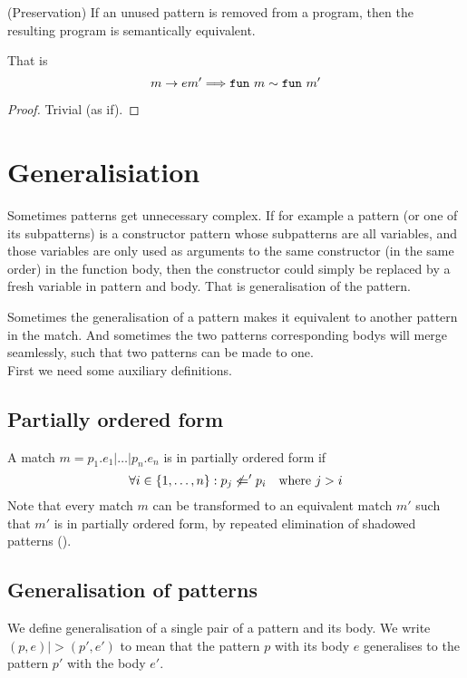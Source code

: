 \begin{lemma}(Preservation)
  If an unused pattern is removed from a program, then the resulting program is
  semantically equivalent.

  That is
  \[
  m ->e m' ==> \texttt{fun}\  m \sim \texttt{fun}\  m'
  \]
\end{lemma}

\begin{proof}
  Trivial (as if).
\end{proof}

\section{Generalisiation}
Sometimes patterns get unnecessary complex. If for example a pattern (or one of
its subpatterns) is a constructor pattern whose subpatterns are all variables,
and those variables are only used as arguments to the same constructor (in the
same order) in the function body, then the constructor could simply be replaced
by a fresh variable in pattern and body. That is generalisation of the pattern.

Sometimes the generalisation of a pattern makes it equivalent to another pattern
in the match. And sometimes the two patterns corresponding bodys will merge
seamlessly, such that two patterns can be made to one.
\\[1em]
First we need some auxiliary definitions.

\subsection{Partially ordered form}
\begin{definition}\label{def:part-order-form}
  A match $m = p_1\texttt{.}e_1\texttt{|}\ldots\texttt{|}p_n\texttt{.}e_n$ is in
  partially ordered form if
  \[
  \forall i \in \{1, \ldots, n\} : p_j \not <=' p_i \quad \textnormal{where $j > i$}
  \]
  Note that every match $m$ can be transformed to an equivalent match $m'$ such
  that $m'$ is in partially ordered form, by repeated elimination of shadowed
  patterns ().
\end{definition}

\subsection{Generalisation of patterns}
We define generalisation of a single pair of a pattern and its body. We write
$(p, e) |> (p', e')$ to mean that the pattern $p$ with its body $e$ generalises
to the pattern $p'$ with the body $e'$.

